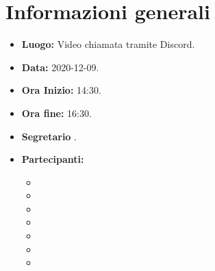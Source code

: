 \section{Informazioni generali}
	\begin{itemize}
		\item \textbf{Luogo:} Video chiamata tramite Discord.
		\item \textbf{Data:} 2020-12-09.
		\item \textbf{Ora Inizio:} 14:30.
		\item \textbf{Ora fine:} 16:30.
		\item \textbf{Segretario} \SB.
		\item \textbf{Partecipanti:}
		\begin{itemize}
			\item \MB
			\item \VAS
			\item \FD
			\item \NM
			\item \SB
			\item \GB
			\item \MDI
		\end{itemize}
		
	\end{itemize}